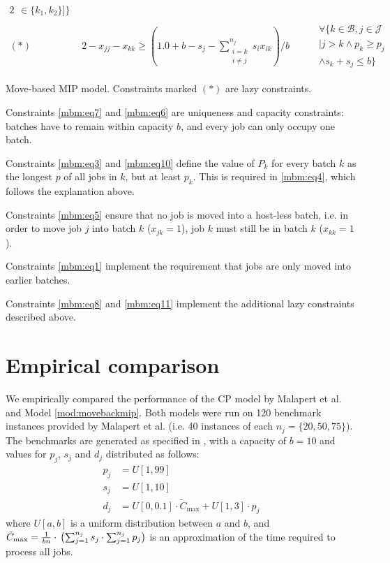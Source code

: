 \documentclass[oribibl]{llncs}
\begin{document}
\begin{model}
\begin{alignat}{2}
\begin{gathered}
\in \{k_1,k_2\}] \} \end{gathered}
 \\[2ex]
(*)\quad &  \label{mbm:eq11}2 - x_{jj} - x_{kk} \geq \left(1.0 + b - s_j -
\sum_{\substack{{i = k}\\{i \neq j}}}^{n_j} s_i
x_{ik}\right) / b \quad && \begin{gathered} \forall \{k \in \mathcal{B}, j \in \mathcal{J} \\| j > k 
\land p_k \geq p_j \\ \land s_k + s_j \leq b\}\end{gathered}
\end{alignat}
\caption{Move-based MIP model. Constraints marked $(*)$ are lazy constraints.}
\label{mod:movebackmip}
\end{model}

Constraints \eqref{mbm:eq7} and \eqref{mbm:eq6} are uniqueness and
capacity constraints: batches have to remain within capacity $b$, and every
job can only occupy one batch.

Constraints \eqref{mbm:eq3} and \eqref{mbm:eq10} define the value of
$P_k$ for every batch $k$ as the longest $p$ of all jobs in $k$, but
at least $p_k$. This is required in \eqref{mbm:eq4}, which follows the
explanation above.

Constraints \eqref{mbm:eq5} ensure that no job is moved into a host-less batch,
i.e. in order to move job $j$ into batch $k$ ($x_{jk} = 1$), job $k$ must still
be in batch $k$ ($x_{kk} = 1$).

Constraints \eqref{mbm:eq1} implement the requirement that jobs are only moved
into earlier batches.

Constraints \eqref{mbm:eq8} and \eqref{mbm:eq11} implement the additional lazy
constraints described above.

\section{Empirical comparison}
\label{sec:exp}

We empirically compared the performance of the CP model by Malapert et al. and
Model \ref{mod:movebackmip}. Both models were run on 120
benchmark instances provided by Malapert et al. (i.e. 40 instances of each $n_j = \{20,
50, 75\}$). The benchmarks are generated as specified in \cite{Daste1}, with a
capacity of $b = 10$ and values for $p_j$, $s_j$ and $d_j$ distributed as follows:
\begin{align}
p_j &= U[1, 99] \\
s_j &= U[1, 10] \\
d_j &= U[0, 0.1] \cdot \tilde{C}_\text{max} + U[1, 3] \cdot p_j
\end{align}
where $U[a, b]$ is a uniform distribution between $a$ and $b$, and
$\tilde{C}_\text{max} = \frac{1}{bn} \cdot \\ \left( \sum_{j=1}^{n_j} s_j \cdot \sum_{j=1}^{n_j}
p_j \right)$ is an approximation of the time required to process
all jobs.
\end{document}
